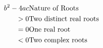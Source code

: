 \documentclass[preview]{standalone}
\begin{document}
\begin{align*}
b^2 - 4ac & \text{Nature of Roots} \cr 
> 0 & \text{Two distinct real roots} \cr 
= 0 & \text{One real root} \cr 
< 0 & \text{Two complex roots}
\end{align*}
\end{document}
